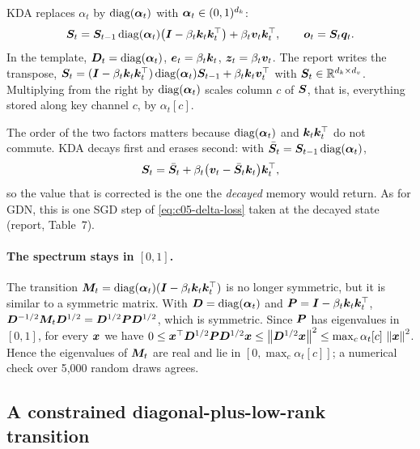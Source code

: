 KDA replaces $\alpha_t$ by $\operatorname{diag}(\bm{\alpha}_t)$ with $\bm{\alpha}_t \in (0,1)^{d_k}$:
\begin{equation}\label{eq:c05-kda}
  \bm{S}_t = \bm{S}_{t-1}\operatorname{diag}(\bm{\alpha}_t)\big(\bm{I} - \beta_t\bm{k}_t\bm{k}_t^{\top}\big) + \beta_t\bm{v}_t\bm{k}_t^{\top},
  \qquad \bm{o}_t = \bm{S}_t\bm{q}_t .
\end{equation}
In the template, $\bm{D}_t = \operatorname{diag}(\bm{\alpha}_t)$, $\bm{e}_t = \beta_t\bm{k}_t$, $\bm{z}_t = \beta_t\bm{v}_t$. The
report writes the transpose, $\bm{S}_t = (\bm{I} - \beta_t\bm{k}_t\bm{k}_t^{\top})\operatorname{diag}(\bm{\alpha}_t)\bm{S}_{t-1} +
\beta_t\bm{k}_t\bm{v}_t^{\top}$ with $\bm{S}_t \in \mathbb{R}^{d_k\times d_v}$. Multiplying from the right by
$\operatorname{diag}(\bm{\alpha}_t)$ scales column $c$ of $\bm{S}$, that is, everything stored along key channel $c$, by
$\alpha_t[c]$.

The order of the two factors matters because $\operatorname{diag}(\bm{\alpha}_t)$ and $\bm{k}_t\bm{k}_t^{\top}$ do not commute.
KDA decays first and erases second: with $\bar{\bm{S}}_t = \bm{S}_{t-1}\operatorname{diag}(\bm{\alpha}_t)$,
\begin{equation}\label{eq:c05-kda-sgd}
  \bm{S}_t = \bar{\bm{S}}_t + \beta_t\big(\bm{v}_t - \bar{\bm{S}}_t\bm{k}_t\big)\bm{k}_t^{\top} ,
\end{equation}
so the value that is corrected is the one the \emph{decayed} memory would return. As for GDN, this
is one SGD step of \cref{eq:c05-delta-loss} taken at the decayed state (report, Table~7).

\paragraph{The spectrum stays in $[0,1]$.} The transition
$\bm{M}_t = \operatorname{diag}(\bm{\alpha}_t)(\bm{I} - \beta_t\bm{k}_t\bm{k}_t^{\top})$ is no longer symmetric, but it is similar to a
symmetric matrix. With $\bm{D} = \operatorname{diag}(\bm{\alpha}_t)$ and $\bm{P} = \bm{I} - \beta_t\bm{k}_t\bm{k}_t^{\top}$,
$\bm{D}^{-1/2}\bm{M}_t\bm{D}^{1/2} = \bm{D}^{1/2}\bm{P}\bm{D}^{1/2}$, which is symmetric. Since $\bm{P}$ has eigenvalues
in $[0,1]$, for every $\bm{x}$ we have
$0 \le \bm{x}^{\top}\bm{D}^{1/2}\bm{P}\bm{D}^{1/2}\bm{x} \le \left\lVert \bm{D}^{1/2}\bm{x}\right\rVert^2 \le \max_c\alpha_t[c]\,\left\lVert \bm{x}\right\rVert^2$.
Hence the eigenvalues of $\bm{M}_t$ are real and lie in $[0, \max_c\alpha_t[c]]$; a numerical check
over 5{,}000 random draws agrees.

\subsection{A constrained diagonal-plus-low-rank transition}\label{sec:c05-kda-dplr}

